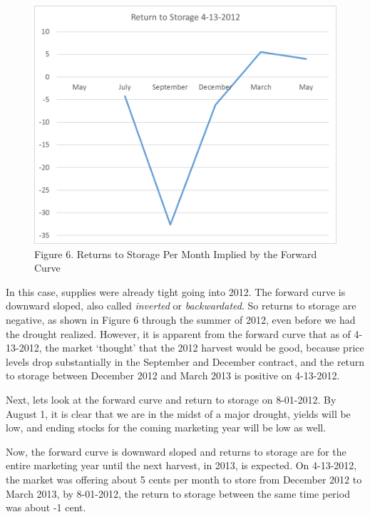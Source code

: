 \documentclass[]{book}
\theoremstyle{definition}
\theoremstyle{definition}
\theoremstyle{remark}
\begin{document}
\begin{figure}[htbp]
\centering
\includegraphics{Excel-files/PricesSpaceTime/forward-curves_files/image011.png}
\caption{Figure 6. Returns to Storage Per Month Implied by the Forward
Curve}
\end{figure}

In this case, supplies were already tight going into 2012. The forward
curve is downward sloped, also called \emph{inverted} or
\emph{backwardated}. So returns to storage are negative, as shown in
Figure 6 through the summer of 2012, even before we had the drought
realized. However, it is apparent from the forward curve that as of
4-13-2012, the market `thought' that the 2012 harvest would be good,
because price levels drop substantially in the September and December
contract, and the return to storage between December 2012 and March 2013
is positive on 4-13-2012.

Next, lets look at the forward curve and return to storage on 8-01-2012.
By August 1, it is clear that we are in the midst of a major drought,
yields will be low, and ending stocks for the coming marketing year will
be low as well.

Now, the forward curve is downward sloped and returns to storage are for
the entire marketing year until the next harvest, in 2013, is expected.
On 4-13-2012, the market was offering about 5 cents per month to store
from December 2012 to March 2013, by 8-01-2012, the return to storage
between the same time period was about -1 cent.
\end{document}
